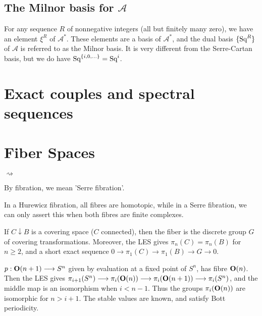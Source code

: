 \documentclass[11pt]{article}
\newcommand{\Squ}{\textup{Sq}}
\theoremstyle{plain}
\theoremstyle{definition}
\renewcommand{\to}{\longrightarrow}
\newcommand{\Steen}{\mathscr{A}}
\newcommand{\Orth}{\textup{\textbf{O}}}
\newenvironment{itemise}{
\begin{list}{\textup{$\rightsquigarrow$}}
   {
      \setlength{\topsep}{.1cm}
      \setlength{\itemsep}{1pt}
      \setlength{\parskip}{0pt}
      \setlength{\parsep}{0pt}
   }
}{\end{list}\vspace{-.2cm}}
\begin{document}
\subsection{The Milnor basis for \texorpdfstring{$\Steen$}{A}}
For any sequence $R$ of nonnegative integers (all but finitely many zero), we have an element $\xi^R$ of $\Steen^*$. These elements are a basis of $\Steen^*$, and the dual basis $\{\Squ^R\}$ of $\Steen$ is referred to as the Milnor basis. It is very different from the Serre-Cartan basis, but we do have $\Squ^{\{i,0,\ldots\}}=\Squ^i$.

\section{Exact couples and spectral sequences}

\section{Fiber Spaces}
\begin{itemise}
\item By fibration, we mean 'Serre fibration'.
\item In a Hurewicz fibration, all fibres are homotopic, while in a Serre fibration, we can only assert this when both fibres are finite complexes.
\item If $C\downarrow B$ is a covering space ($C$ connected), then the fiber is the discrete group $G$ of covering transformations. Moreover, the LES gives $\pi_n(C)=\pi_n(B)$ for $n\geq2$, and a short exact sequence $0\to\pi_1(C)\to\pi_1(B)\to G\to0$.
\item $p:\Orth(n+1)\to S^n$ given by evaluation at a fixed point of $S^n$, has fibre $\Orth(n)$. Then the LES gives $\pi_{i+1}(S^n)\to\pi_i(\Orth(n))\to\pi_i(\Orth(n+1))\to\pi_i(S^n)$, and the middle map is an isomorphism when $i<n-1$. Thus the groups $\pi_i(\Orth(n))$ are isomorphic for $n>i+1$. The stable values are known, and satisfy Bott periodicity.
\end{itemise}
\setcounter{subsection}{3}
\end{document}
